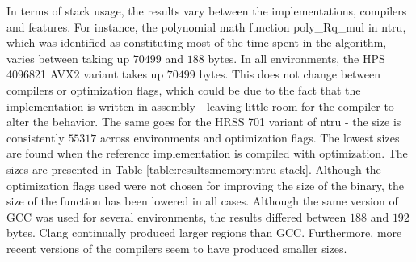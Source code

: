 In terms of stack usage, the results vary between the implementations, compilers and features. For instance, the polynomial math function poly\_Rq\_mul in \gls{ntru}, which was identified as constituting most of the time spent in the algorithm, varies between taking up $70499$ and $188$ bytes. In all environments, the HPS 4096821 AVX2 variant takes up $70499$ bytes. This does not change between compilers or optimization flags, which could be due to the fact that the implementation is written in assembly - leaving little room for the compiler to alter the behavior. The same goes for the HRSS 701 variant of \gls{ntru} - the size is consistently $55317$ across environments and optimization flags. The lowest sizes are found when the reference implementation is compiled with optimization. The sizes are presented in Table \ref{table:results:memory:ntru-stack}. Although the optimization flags used were not chosen for improving the size of the binary, the size of the function has been lowered in all cases. Although the same version of GCC was used for several environments, the results differed between $188$ and $192$ bytes. Clang continually produced larger regions than GCC. Furthermore, more recent versions of the compilers seem to have produced smaller sizes.

